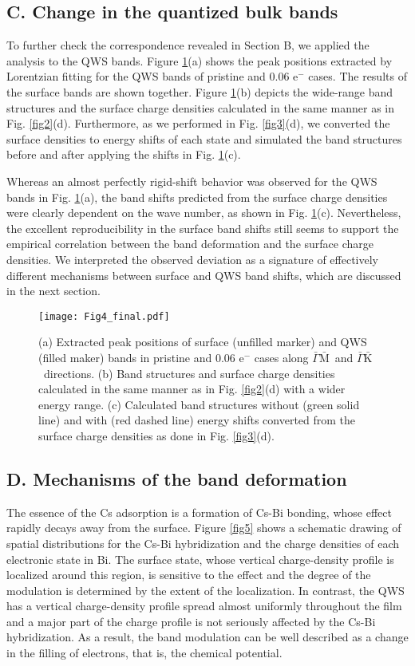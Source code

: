 \documentclass[reprint,secnumarabic,amssymb, nobibnotes, aps, prl,superscriptaddress,showpacs]{revtex4-1}
\def\gmb{${\bar{\Gamma}}{\bar{\mathrm{M}}}$\ }
\def\gkb{${\bar{\Gamma}}{\bar{\mathrm{K}}}$\ }
\begin{document}
\subsection{C. Change in the quantized bulk bands}

To further check the correspondence revealed in Section B, we applied the analysis to the QWS bands. Figure \ref{fig4}(a) shows the peak positions extracted by Lorentzian fitting for the QWS bands of pristine and 0.06 e$^-$ cases. The results of the surface bands are shown together. Figure \ref{fig4}(b) depicts the wide-range band structures and the surface charge densities calculated in the same manner as in Fig. \ref{fig2}(d). Furthermore, as we performed in Fig. \ref{fig3}(d), we converted the surface densities to energy shifts of each state and simulated the band structures before and after applying the shifts in Fig. \ref{fig4}(c). 

Whereas an almost perfectly rigid-shift behavior was observed for the QWS bands in Fig. \ref{fig4}(a), the band shifts predicted from the surface charge densities were clearly dependent on the wave number, as shown in Fig. \ref{fig4}(c). Nevertheless, the excellent reproducibility in the surface band shifts still seems to support the empirical correlation between the band deformation and the surface charge densities. We interpreted the observed deviation as a signature of effectively different mechanisms between surface and QWS band shifts, which are discussed in the next section.

\begin{figure}
\texttt{[image: Fig4\_final.pdf]}
\caption{\label{fig4} (a) Extracted peak positions of surface (unfilled marker) and QWS (filled maker) bands in pristine and 0.06 e$^-$ cases along \gmb and \gkb directions. (b) Band structures and surface charge densities calculated in the same manner as in Fig. \ref{fig2}(d) with a wider energy range. (c) Calculated band structures without (green solid line) and with (red dashed line) energy shifts converted from the surface charge densities as done in Fig. \ref{fig3}(d).} 	
\end{figure} 

\subsection{D. Mechanisms of the band deformation}
The essence of the Cs adsorption is a formation of Cs-Bi bonding, whose effect rapidly decays away from the surface. Figure \ref{fig5} shows a schematic drawing of spatial distributions for the Cs-Bi hybridization and the charge densities of each electronic state in Bi. The surface state, whose vertical charge-density profile is localized around this region, is sensitive to the effect and the degree of the modulation is determined by the extent of the localization. In contrast, the QWS has a vertical charge-density profile spread almost uniformly throughout the film and a major part of the charge profile is not seriously affected by the Cs-Bi hybridization. As a result, the band modulation can be well described as a change in the filling of electrons, that is, the chemical potential.
\end{document}
